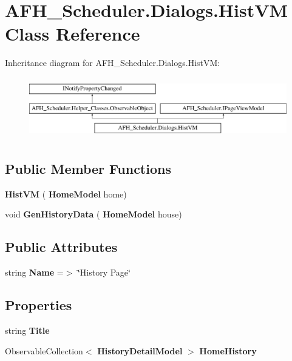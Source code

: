 \section{A\+F\+H\+\_\+\+Scheduler.\+Dialogs.\+Hist\+VM Class Reference}
\label{class_a_f_h___scheduler_1_1_dialogs_1_1_hist_v_m}
Inheritance diagram for A\+F\+H\+\_\+\+Scheduler.\+Dialogs.\+Hist\+VM\+:\begin{figure}[H]
\begin{center}
\leavevmode
\includegraphics[height=2.700965cm]{class_a_f_h___scheduler_1_1_dialogs_1_1_hist_v_m}
\end{center}
\end{figure}
\subsection*{Public Member Functions}
\begin{DoxyCompactItemize}
\item 
\mbox{\label{class_a_f_h___scheduler_1_1_dialogs_1_1_hist_v_m_a3a95b9fd299d0b3795437a46beb3a8d1}} 
{\bfseries Hist\+VM} (\textbf{ Home\+Model} home)
\item 
\mbox{\label{class_a_f_h___scheduler_1_1_dialogs_1_1_hist_v_m_af32eee969b42549447a710084cbf3156}} 
void {\bfseries Gen\+History\+Data} (\textbf{ Home\+Model} house)
\end{DoxyCompactItemize}
\subsection*{Public Attributes}
\begin{DoxyCompactItemize}
\item 
\mbox{\label{class_a_f_h___scheduler_1_1_dialogs_1_1_hist_v_m_a457bb24d3503d73282eb1d4b03d59c61}} 
string {\bfseries Name} =$>$ \char`\"{}History Page\char`\"{}
\end{DoxyCompactItemize}
\subsection*{Properties}
\begin{DoxyCompactItemize}
\item 
\mbox{\label{class_a_f_h___scheduler_1_1_dialogs_1_1_hist_v_m_a7078679ab85ec65c5cef7e503369fa8b}} 
string {\bfseries Title}\hspace{0.3cm}{\ttfamily  [get, set]}
\item 
\mbox{\label{class_a_f_h___scheduler_1_1_dialogs_1_1_hist_v_m_a2471888165b5d6432d1e82e1d6cfb57e}} 
Observable\+Collection$<$ \textbf{ History\+Detail\+Model} $>$ {\bfseries Home\+History}\hspace{0.3cm}{\ttfamily  [get, set]}
\end{DoxyCompactItemize}

